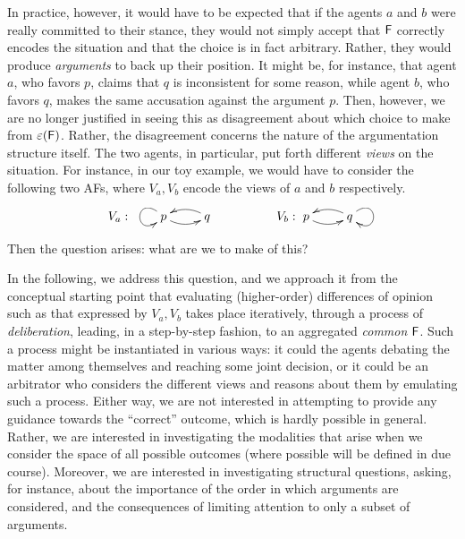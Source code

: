 \documentclass{llncs}
\newcommand{\af}{{\sf F}}
\newcommand{\sem}{\varepsilon}
\begin{document}
In practice, however, it would have to be expected that if the agents $a$ and $b$ were really committed to their stance, they would not simply accept that $\af$ correctly encodes the situation and that the choice is in fact arbitrary. Rather, they would produce \emph{arguments} to back up their position. It might be, for instance, that agent $a$, who favors $p$, claims that $q$ is inconsistent for some reason, while agent $b$, who favors $q$, makes the same accusation against the argument $p$. Then, however, we are no longer justified in seeing this as disagreement about which choice to make from $\sem(\af)$. Rather, the disagreement concerns the nature of the argumentation structure itself. The two agents, in particular, put forth different \emph{views} on the situation. For instance, in our toy example, we would have to consider the following two AFs, where $V_a, V_b$ encode the views of $a$ and $b$ respectively.

\begin{equation}\label{ex}
\begin{array}{ll}
V_a: \hspace{2em} \xymatrix{p \ar@(lu,ld) \ar@/_/[r] & q \ar@/_/[l] } & \hspace{4em} V_b: \xymatrix{p \ar@/_/[r] & q \ar@(ru,rd) \ar@/_/[l] }
\end{array}
\end{equation}

Then the question arises: what are we to make of this? 

In the following, we address this question, and we approach it from the conceptual starting point that evaluating (higher-order) differences of opinion such as that expressed by $V_a,V_b$ takes place iteratively, through a process of \emph{deliberation}, leading, in a step-by-step fashion, to an aggregated \emph{common} $\af$. Such a process might be instantiated in various ways: it could the agents debating the matter among themselves and reaching some joint decision, or it could be an arbitrator who considers the different views and reasons about them by emulating such a process. Either way, we are not interested in attempting to provide any guidance towards the ``correct'' outcome, which is hardly possible in general. Rather, we are interested in investigating the modalities that arise when we consider the space of all possible outcomes (where possible will be defined in due course). Moreover, we are interested in investigating structural questions, asking, for instance, about the importance of the order in which arguments are considered, and the consequences of limiting attention to only a subset of arguments.
\end{document}
